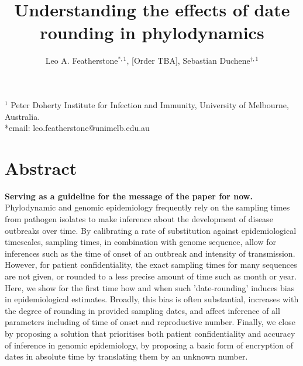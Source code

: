 \documentclass{article}
\title{Understanding the effects of date rounding in phylodynamics}
\author{Leo A. Featherstone$^{\ast,1}$, [Order TBA], Sebastian Duchene$^{\dagger,1}$}
\begin{document}
\maketitle
\linenumbers
$^{1}$ Peter Doherty Institute for Infection and Immunity, University of Melbourne, Australia.\\
*email: leo.featherstone@unimelb.edu.au

\section*{Abstract}
\textbf{Serving as a guideline for the message of the paper for now.}
Phylodynamic and genomic epidemiology frequently rely on the sampling times from pathogen isolates to make inference about the development of disease outbreaks over time. By calibrating a rate of substitution against epidemiological timescales, sampling times, in combination with genome sequence, allow for inferences such as the time of onset of an outbreak and intensity of transmission. However, for patient confidentiality, the exact sampling times for many sequences are not given, or rounded to a less precise amount of time such as month or year. Here, we show for the first time how and when such 'date-rounding' induces bias in epidemiological estimates. Broadly, this bias is often substantial, increases with the degree of rounding in provided sampling dates, and affect inference of all parameters including of time of onset and reproductive number. Finally, we close by proposing a solution that prioritises both patient confidentiality and accuracy of inference in genomic epidemiology, by proposing a basic form of encryption of dates in absolute time by translating them by an unknown number.
\end{document}
